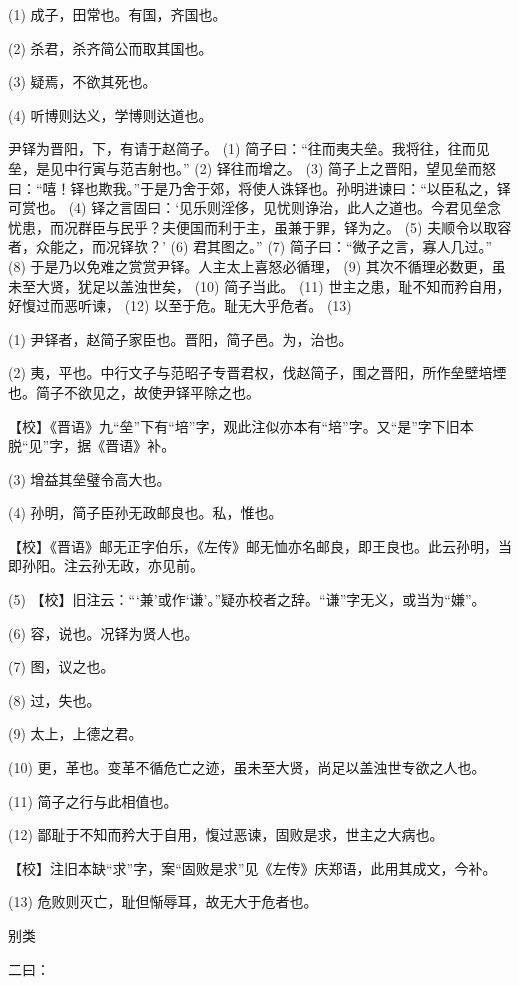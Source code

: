 \documentclass[12pt,UTF8]{ctexbook}
\begin{document}
(1) 成子，田常也。有国，齐国也。

(2) 杀君，杀齐简公而取其国也。

(3) 疑焉，不欲其死也。

(4) 听博则达义，学博则达道也。

尹铎为晋阳，下，有请于赵简子。 (1) 简子曰：“往而夷夫垒。我将往，往而见垒，是见中行寅与范吉射也。” (2) 铎往而增之。 (3) 简子上之晋阳，望见垒而怒曰：“嘻！铎也欺我。”于是乃舍于郊，将使人诛铎也。孙明进谏曰：“以臣私之，铎可赏也。 (4) 铎之言固曰：‘见乐则淫侈，见忧则诤治，此人之道也。今君见垒念忧患，而况群臣与民乎？夫便国而利于主，虽兼于罪，铎为之。 (5) 夫顺令以取容者，众能之，而况铎欤？’ (6) 君其图之。” (7) 简子曰：“微子之言，寡人几过。” (8) 于是乃以免难之赏赏尹铎。人主太上喜怒必循理， (9) 其次不循理必数更，虽未至大贤，犹足以盖浊世矣， (10) 简子当此。 (11) 世主之患，耻不知而矜自用，好愎过而恶听谏， (12) 以至于危。耻无大乎危者。 (13)

(1) 尹铎者，赵简子家臣也。晋阳，简子邑。为，治也。

(2) 夷，平也。中行文子与范昭子专晋君权，伐赵简子，围之晋阳，所作垒壁培堙也。简子不欲见之，故使尹铎平除之也。

【校】《晋语》九“垒”下有“培”字，观此注似亦本有“培”字。又“是”字下旧本脱“见”字，据《晋语》补。

(3) 增益其垒璧令高大也。

(4) 孙明，简子臣孙无政邮良也。私，惟也。

【校】《晋语》邮无正字伯乐，《左传》邮无恤亦名邮良，即王良也。此云孙明，当即孙阳。注云孙无政，亦见前。

(5) 【校】旧注云：“‘兼’或作‘谦’。”疑亦校者之辞。“谦”字无义，或当为“嫌”。

(6) 容，说也。况铎为贤人也。

(7) 图，议之也。

(8) 过，失也。

(9) 太上，上德之君。

(10) 更，革也。变革不循危亡之迹，虽未至大贤，尚足以盖浊世专欲之人也。

(11) 简子之行与此相值也。

(12) 鄙耻于不知而矜大于自用，愎过恶谏，固败是求，世主之大病也。

【校】注旧本缺“求”字，案“固败是求”见《左传》庆郑语，此用其成文，今补。

(13) 危败则灭亡，耻但惭辱耳，故无大于危者也。





别类


二曰：
\end{document}
